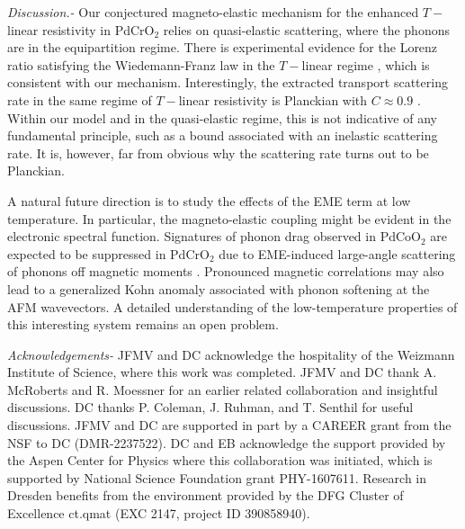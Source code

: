 \documentclass[aps,prl,twocolumn,superscriptaddress,amsmath,nofootinbib,10pt,floatfix]{revtex4-2}
\begin{document}
{\it Discussion.-} Our conjectured magneto-elastic mechanism for  the enhanced $T-$linear resistivity in PdCrO$_2$ relies on quasi-elastic scattering, where the phonons are in the equipartition regime. There is experimental evidence for the Lorenz ratio satisfying the Wiedemann-Franz law in the $T-$linear regime \cite{Zhakina2023}, which is consistent with our mechanism. Interestingly, the extracted transport scattering rate in the same regime of $T-$linear resistivity is Planckian with $C\approx 0.9$ \cite{Zhakina2023}. Within our model and in the quasi-elastic regime, this is not indicative of any fundamental principle, such as a bound associated with an inelastic scattering rate. It is, however, far from obvious why the scattering rate turns out to be Planckian. 

A natural future direction is to study the effects of the EME term at low temperature.  In particular, the magneto-elastic coupling might be evident in the electronic spectral function. Signatures of phonon drag observed in PdCoO$_2$ \cite{Hicks_mobility_2012} are expected to be suppressed in PdCrO$_2$ due to EME-induced large-angle scattering of phonons off magnetic moments \cite{takatsu_critical_2009}. Pronounced magnetic correlations may also lead to a generalized Kohn anomaly \cite{Kohn_anomaly} associated with phonon softening at the AFM wavevectors. A detailed understanding of the low-temperature properties of this interesting system remains an open problem.

{\it Acknowledgements-} JFMV and DC acknowledge the hospitality of the Weizmann Institute of Science, where this work was completed. JFMV and DC thank A. McRoberts and R. Moessner for an earlier related collaboration \cite{mcroberts2022intermediatescale} and insightful discussions. DC thanks P. Coleman, J. Ruhman, and T. Senthil for useful discussions. JFMV and DC are supported in part by a CAREER grant from the NSF to DC (DMR-2237522). DC and EB acknowledge the support provided by the Aspen Center for Physics where this collaboration was initiated, which is supported by National Science Foundation grant PHY-1607611. Research in Dresden benefits from the environment provided by the DFG Cluster of Excellence ct.qmat (EXC 2147, project ID 390858940).



\end{document}
